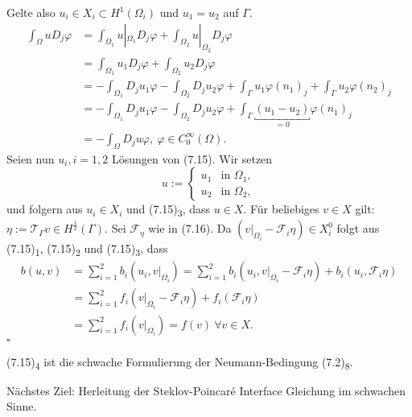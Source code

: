 Gelte also $u_i\in X_i\subset H^1(\Omega_i)$ und $u_1=u_2$ auf $\Gamma$.
\begin{align*}
\int_{\Omega} u D_j \varphi &=  \int_{\Omega_1} u|_{\Omega_1} D_j \varphi + \int_{\Omega_2} u|_{\Omega_2} D_j \varphi\\
&= \int_{\Omega_1} u_1 D_j \varphi + \int_{\Omega_2} u_2 D_j \varphi\\
&= - \int_{\Omega_1} D_j u_1 \varphi - \int_{\Omega_2} D_j u_2 \varphi + \int_\Gamma u_1 \varphi (n_1)_j + \int_\Gamma u_2 \varphi (n_2)_j\\
&= - \int_{\Omega_1} D_j u_1 \varphi - \int_{\Omega_2} D_j u_2 \varphi + \int_\Gamma \underbracket{(u_1-u_2)}_{=0} \varphi (n_1)_j\\
&= - \int_{\Omega} D_j u \varphi, ~\varphi \in C_0^\infty(\Omega).
\end{align*}
Seien nun $u_i,i=1,2$ Lösungen von (7.15). 
Wir setzen
\[
u := \left\{\begin{array}{lc} u_1 & \text{in } \Omega_1,\\ u_2 & \text{in } \Omega_2, \end{array}\right.
\]
und folgern aus $u_i\in X_i$ und (7.15)\textsubscript{3}, dass $u\in X$.
Für beliebiges $v\in X$ gilt: $\eta:= \mathcal{T}_\Gamma v \in H^{\frac{1}{2}}(\Gamma)$. Sei $\mathcal{F}_\eta$ wie in (7.16).
Da $(v|_{\Omega_i} - \mathcal{F}_i\eta)\in X_i^0$ folgt aus (7.15)\textsubscript{1}, (7.15)\textsubscript{2} und (7.15)\textsubscript{3}, dass
\begin{align*}
b(u,v) &= \sum_{i=1}^{2} b_i(u_i,v|_{\Omega_i}) = \sum_{i=1}^{2} b_i(u_i,v|_{\Omega_i} - \mathcal{F}_i\eta) + b_i(u_i,\mathcal{F}_i\eta)\\
&= \sum_{i=1}^2 f_i(v|_{\Omega_i} - \mathcal{F}_i\eta) + f_i(\mathcal{F}_i\eta)\\
&= \sum_{i=1}^2 f_i(v|_{\Omega_i}) = f(v) ~\forall v\in X.
\end{align*}
\hfill $\square$

(7.15)\textsubscript{4} ist die schwache Formulierung der Neumann-Bedingung (7.2)\textsubscript{8}.

Nächstes Ziel: Herleitung der Steklov-Poincaré Interface Gleichung im schwachen Sinne.

